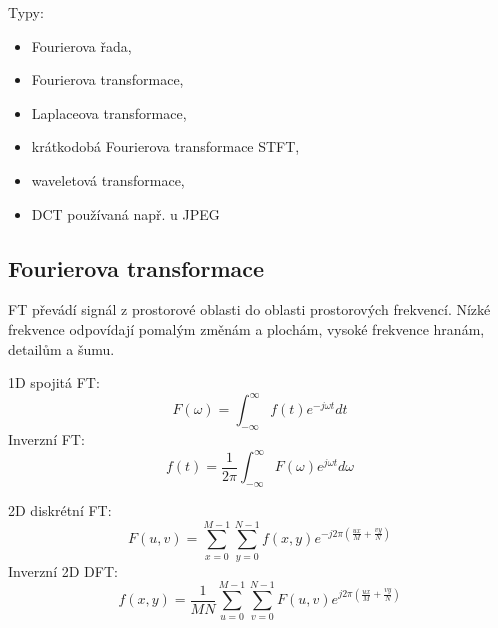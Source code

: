 Typy:
\begin{itemize}
    \item Fourierova řada,
    \item Fourierova transformace,
    \item Laplaceova transformace,
    \item krátkodobá Fourierova transformace STFT,
    \item waveletová transformace,
    \item DCT používaná např. u JPEG
\end{itemize}

\subsection*{Fourierova transformace}
FT převádí signál z prostorové oblasti do oblasti prostorových frekvencí.
Nízké frekvence odpovídají pomalým změnám a plochám, vysoké frekvence hranám, detailům a šumu.

1D spojitá FT:
\begin{equation}
    F(\omega)=\int_{-\infty}^{\infty} f(t)e^{-j\omega t}dt
\end{equation}
Inverzní FT:
\begin{equation}
    f(t)=\frac{1}{2\pi}\int_{-\infty}^{\infty}F(\omega)e^{j\omega t}d\omega
\end{equation}

2D diskrétní FT:
\begin{equation}
    F(u,v)=\sum_{x=0}^{M-1}\sum_{y=0}^{N-1}
    f(x,y)e^{-j2\pi\left(\frac{ux}{M}+\frac{vy}{N}\right)}
\end{equation}
Inverzní 2D DFT:
\begin{equation}
    f(x,y)=\frac{1}{MN}\sum_{u=0}^{M-1}\sum_{v=0}^{N-1}
    F(u,v)e^{j2\pi\left(\frac{ux}{M}+\frac{vy}{N}\right)}
\end{equation}

